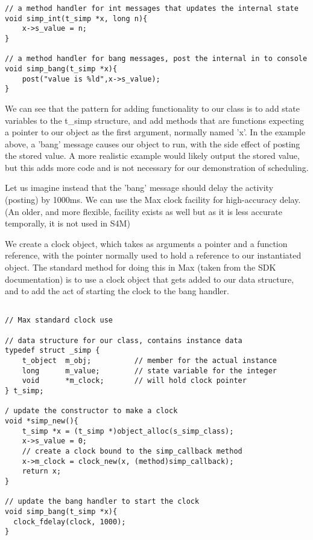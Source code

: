 \documentclass[acmsmall]{acmart}
\begin{document}
{\begin{verbatim}
// a method handler for int messages that updates the internal state
void simp_int(t_simp *x, long n){
    x->s_value = n;
}

// a method handler for bang messages, post the internal in to console
void simp_bang(t_simp *x){
    post("value is %ld",x->s_value);
}

\end{verbatim}

We can see that the pattern for adding functionality to our class is to
add state variables to the t\_simp structure, and add methods that are
functions expecting a pointer to our object as the first argument,
normally named 'x'. In the example above, a 'bang' message causes our
object to run, with the side effect of posting the stored value. A more
realistic example would likely output the stored value, but this adds more code
and is not necessary for our demonstration of scheduling.

Let us imagine instead that the 'bang' message should delay the activity
(posting) by 1000ms. We can use the Max clock facility for high-accuracy
delay. (An older, and more flexible, facility exists as well but as it is
less accurate temporally, it is not used in S4M) 

We create a clock object, which takes as arguments a pointer and a function
reference, with the pointer normally used to hold a reference to our instantiated
object. The standard method for doing this in Max (taken from the SDK documentation)
is to use a clock object that gets added to our data structure, and to add the act
of starting the clock to the bang handler.

\begin{verbatim}

// Max standard clock use

// data structure for our class, contains instance data
typedef struct _simp {
    t_object  m_obj;          // member for the actual instance 
    long      m_value;        // state variable for the integer
    void      *m_clock;       // will hold clock pointer
} t_simp;

/ update the constructor to make a clock
void *simp_new(){
    t_simp *x = (t_simp *)object_alloc(s_simp_class);
    x->s_value = 0;
    // create a clock bound to the simp_callback method
    x->m_clock = clock_new(x, (method)simp_callback); 
    return x;
}

// update the bang handler to start the clock
void simp_bang(t_simp *x){
  clock_fdelay(clock, 1000);
}


\end{verbatim}}
\end{document}
